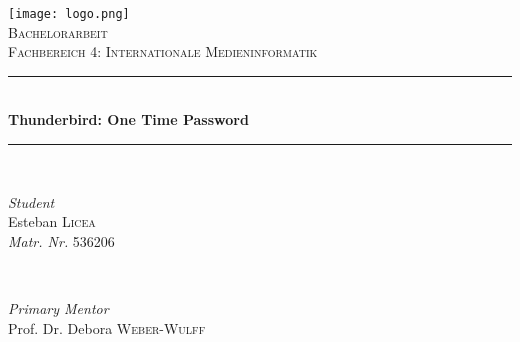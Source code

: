


\begin{titlepage} %
	\newcommand{\HRule}{\rule{\linewidth}{0.5mm}} %
	
	\center %
	
	
		\texttt{[image: logo.png]}\\[1cm] %
	
	\textsc{\Large Bachelorarbeit}\\[0.5cm] %
	
	\textsc{\large Fachbereich 4: Internationale Medieninformatik}\\[0.5cm] %
	
	
	\HRule\\[0.4cm]
	
	{\huge\bfseries Thunderbird: One Time Password}\\[0.4cm] %
	
	\HRule\\[1.5cm]
	
	
	\begin{minipage}{0.4\textwidth}
		\begin{flushleft}
			\large
			\textit{Student}\\
			Esteban \textsc{Licea}\\ %
			\textit{Matr. Nr.} 536206
		\end{flushleft}
	\end{minipage}
	~
	\begin{minipage}{0.4\textwidth}
		\begin{flushright}
			\large
			\textit{Primary Mentor}\\
			Prof. Dr. Debora \textsc{Weber-Wulff} %
		\end{flushright}
		

\end{minipage}
\end{titlepage}
